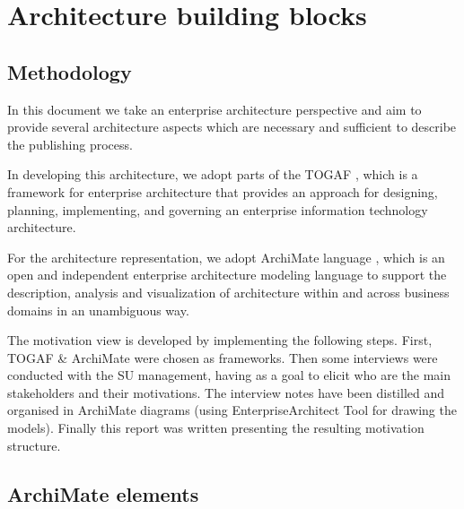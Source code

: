 \section{Architecture building blocks}
\label{sec:building-blocks}


	\subsection{Methodology}
	
	In this document we take an enterprise architecture perspective and aim to provide several architecture aspects which are necessary and sufficient to describe the publishing process. 
	
	In developing this architecture, we adopt parts of the TOGAF \citep{togaf9.2}, which is a framework for enterprise architecture that provides an approach for designing, planning, implementing, and governing an enterprise information technology architecture. 
	
	For the architecture representation, we adopt ArchiMate language \citep{archimate3.1}, which is an open and independent enterprise architecture modeling language to support the description, analysis and visualization of architecture within and across business domains in an unambiguous way.
	
	The motivation view is developed by implementing the following steps. First, TOGAF \& ArchiMate were chosen as frameworks. Then some interviews were conducted with the SU management, having as a goal to elicit who are the main stakeholders and their motivations. The interview notes have been distilled and organised in ArchiMate diagrams (using EnterpriseArchitect Tool for drawing the models). Finally this report was written presenting the resulting motivation structure. 
	
	\subsection{ArchiMate elements}
	

